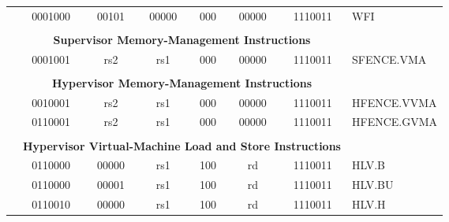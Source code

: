 \begin{table}[p]
\begin{small}
\begin{center}
\begin{tabular}{p{0in}p{0.4in}p{0.05in}p{0.05in}p{0.05in}p{0.05in}p{0.4in}p{0.6in}p{0.4in}p{0.6in}p{0.7in}l}
&
\multicolumn{4}{|c|}{0001000} &
\multicolumn{2}{c|}{00101} &
\multicolumn{1}{c|}{00000} &
\multicolumn{1}{c|}{000} &
\multicolumn{1}{c|}{00000} &
\multicolumn{1}{c|}{1110011} & WFI \\
\cline{2-11}
  

&
\multicolumn{10}{c}{} & \\
&
\multicolumn{10}{c}{\bf Supervisor Memory-Management Instructions} & \\
\cline{2-11}
  

&
\multicolumn{4}{|c|}{0001001} &
\multicolumn{2}{c|}{rs2} &
\multicolumn{1}{c|}{rs1} &
\multicolumn{1}{c|}{000} &
\multicolumn{1}{c|}{00000} &
\multicolumn{1}{c|}{1110011} & SFENCE.VMA \\
\cline{2-11}
  

&
\multicolumn{10}{c}{} & \\
&
\multicolumn{10}{c}{\bf Hypervisor Memory-Management Instructions} & \\
\cline{2-11}
  

&
\multicolumn{4}{|c|}{0010001} &
\multicolumn{2}{c|}{rs2} &
\multicolumn{1}{c|}{rs1} &
\multicolumn{1}{c|}{000} &
\multicolumn{1}{c|}{00000} &
\multicolumn{1}{c|}{1110011} & HFENCE.VVMA \\
\cline{2-11}
  

&
\multicolumn{4}{|c|}{0110001} &
\multicolumn{2}{c|}{rs2} &
\multicolumn{1}{c|}{rs1} &
\multicolumn{1}{c|}{000} &
\multicolumn{1}{c|}{00000} &
\multicolumn{1}{c|}{1110011} & HFENCE.GVMA \\
\cline{2-11}
  

&
\multicolumn{10}{c}{} & \\
&
\multicolumn{10}{c}{\bf Hypervisor Virtual-Machine Load and Store Instructions} & \\
\cline{2-11}


&
\multicolumn{4}{|c|}{0110000} &
\multicolumn{2}{c|}{00000} &
\multicolumn{1}{c|}{rs1} &
\multicolumn{1}{c|}{100} &
\multicolumn{1}{c|}{rd} &
\multicolumn{1}{c|}{1110011} & HLV.B \\
\cline{2-11}


&
\multicolumn{4}{|c|}{0110000} &
\multicolumn{2}{c|}{00001} &
\multicolumn{1}{c|}{rs1} &
\multicolumn{1}{c|}{100} &
\multicolumn{1}{c|}{rd} &
\multicolumn{1}{c|}{1110011} & HLV.BU \\
\cline{2-11}


&
\multicolumn{4}{|c|}{0110010} &
\multicolumn{2}{c|}{00000} &
\multicolumn{1}{c|}{rs1} &
\multicolumn{1}{c|}{100} &
\multicolumn{1}{c|}{rd} &
\multicolumn{1}{c|}{1110011} & HLV.H \\
\cline{2-11}



\end{tabular}
\end{center}
\end{small}
\end{table}
